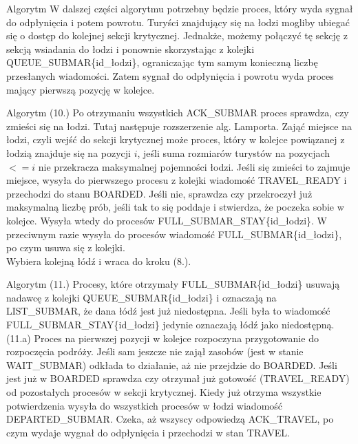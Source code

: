 \documentclass{beamer}
\begin{document}
\begin{frame}{Algorytm}
    \internallinenumbers
    W dalszej części algorytmu potrzebny będzie proces, który wyda sygnał do odpłynięcia i potem powrotu. Turyści znajdujący się na łodzi mogliby ubiegać się o dostęp do kolejnej sekcji krytycznej. Jednakże, możemy połączyć tę sekcję z sekcją wsiadania do łodzi i ponownie skorzystając z kolejki QUEUE\_SUBMAR\{id\_łodzi\}, ograniczając tym samym konieczną liczbę przesłanych wiadomości. Zatem sygnał do odpłynięcia i powrotu wyda proces mający pierwszą pozycję w kolejce.
\end{frame}

\begin{frame}{Algorytm}
    \internallinenumbers
    (10.) Po otrzymaniu wszystkich ACK\_SUBMAR proces sprawdza, czy zmieści się na łodzi. Tutaj następuje rozszerzenie alg. Lamporta. Zająć miejsce na łodzi, czyli wejść do sekcji krytycznej może proces, który w kolejce powiązanej z łodzią znajduje się na pozycji $i$, jeśli suma rozmiarów turystów na pozycjach $<= i$ nie przekracza maksymalnej pojemności łodzi. Jeśli się zmieści to zajmuje miejsce, wysyła do pierwszego procesu z kolejki wiadomość TRAVEL\_READY i przechodzi do stanu BOARDED. Jeśli nie, sprawdza czy przekroczył już maksymalną liczbę prób, jeśli tak to się poddaje i stwierdza, że poczeka sobie w kolejce. Wysyła wtedy do procesów FULL\_SUBMAR\_STAY\{id\_łodzi\}. W przeciwnym razie wysyła do procesów wiadomość FULL\_SUBMAR\{id\_łodzi\}, po czym usuwa się z kolejki. \\
    Wybiera kolejną łódź i wraca do kroku (8.).
\end{frame}

\begin{frame}{Algorytm}
    \internallinenumbers
    (11.) Procesy, które otrzymały FULL\_SUBMAR\{id\_łodzi\} usuwają nadawcę z kolejki QUEUE\_SUBMAR\{id\_łodzi\} i oznaczają na LIST\_SUBMAR, że dana łódź jest już niedostępna. Jeśli była to wiadomość FULL\_SUBMAR\_STAY\{id\_łodzi\} jedynie oznaczają łódź jako niedostępną. \\

    (11.a) Proces na pierwszej pozycji w kolejce rozpoczyna przygotowanie do rozpoczęcia podróży. Jeśli sam jeszcze nie zajął zasobów (jest w stanie WAIT\_SUBMAR) odkłada to działanie, aż nie przejdzie do BOARDED. Jeśli jest już w BOARDED sprawdza czy otrzymał już gotowość (TRAVEL\_READY) od pozostałych procesów w sekcji krytycznej. Kiedy już otrzyma wszystkie potwierdzenia wysyła do wszystkich procesów w łodzi wiadomość DEPARTED\_SUBMAR. Czeka, aż wszyscy odpowiedzą ACK\_TRAVEL, po czym wydaje wygnał do odpłynięcia i przechodzi w stan TRAVEL.
\end{frame}
\end{document}
